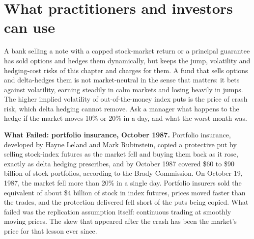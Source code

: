 \section{What practitioners and investors can use}
\label{sec:14-investors}

A bank selling a note with a capped stock-market return or a principal guarantee has sold options and hedges them dynamically, but keeps the jump, volatility and hedging-cost risks of this chapter and charges for them. A fund that sells options and delta-hedges them is not market-neutral in the sense that matters: it bets against volatility, earning steadily in calm markets and losing heavily in jumps. The higher implied volatility of out-of-the-money index puts is the price of crash risk, which delta hedging cannot remove. Ask a manager what happens to the hedge if the market moves 10\% or 20\% in a day, and what the worst month was.

\begin{callout}
\textbf{What Failed: portfolio insurance, October 1987.} Portfolio insurance, developed by Hayne Leland and Mark Rubinstein, copied a protective put by selling stock-index futures as the market fell and buying them back as it rose, exactly as delta hedging prescribes, and by October 1987 covered \$60 to \$90 billion of stock portfolios, according to the Brady Commission. On October 19, 1987, the market fell more than 20\% in a single day. Portfolio insurers sold the equivalent of about \$4 billion of stock in index futures, prices moved faster than the trades, and the protection delivered fell short of the puts being copied. What failed was the replication assumption itself: continuous trading at smoothly moving prices. The skew that appeared after the crash has been the market's price for that lesson ever since.
\end{callout}

\makeatletter
{}
\makeatother

